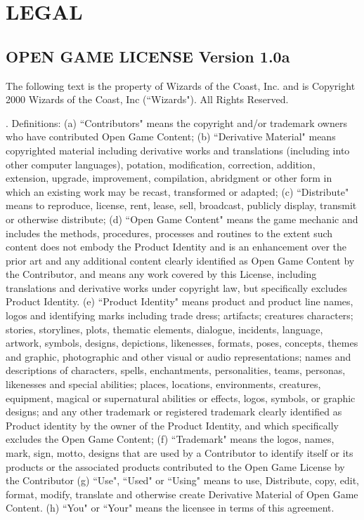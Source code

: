 \chapter{LEGAL}

\begin{multicols}{2}

\section{OPEN GAME LICENSE Version 1.0a} 

\noindent The following text is the property of Wizards of the Coast, Inc. and is Copyright 2000 Wizards of the Coast, Inc (``Wizards"). All Rights Reserved. 

\vspace{1em} . Definitions: (a) ``Contributors" means the copyright and/or trademark owners who have contributed Open Game Content; (b) ``Derivative Material" means copyrighted material including derivative works and translations (including into other computer languages), potation, modification, correction, addition, extension, upgrade, improvement, compilation, abridgment or other form in which an existing work may be recast, transformed or adapted; (c) ``Distribute" means to reproduce, license, rent, lease, sell, broadcast, publicly display, transmit or otherwise distribute; (d) ``Open Game Content" means the game mechanic and includes the methods, procedures, processes and routines to the extent such content does not embody the Product Identity and is an enhancement over the prior art and any additional content clearly identified as Open Game Content by the Contributor, and means any work covered by this License, including translations and derivative works under copyright law, but specifically excludes Product Identity. (e) ``Product Identity" means product and product line names, logos and identifying marks including trade dress; artifacts; creatures characters; stories, storylines, plots, thematic elements, dialogue, incidents, language, artwork, symbols, designs, depictions, likenesses, formats, poses, concepts, themes and graphic, photographic and other visual or audio representations; names and descriptions of characters, spells, enchantments, personalities, teams, personas, likenesses and special abilities; places, locations, environments, creatures, equipment, magical or supernatural abilities or effects, logos, symbols, or graphic designs; and any other trademark or registered trademark clearly identified as Product identity by the owner of the Product Identity, and which specifically excludes the Open Game Content; (f) ``Trademark" means the logos, names, mark, sign, motto, designs that are used by a Contributor to identify itself or its products or the associated products contributed to the Open Game License by the Contributor (g) ``Use", ``Used" or ``Using" means to use, Distribute, copy, edit, format, modify, translate and otherwise create Derivative Material of Open Game Content. (h) ``You" or ``Your" means the licensee in terms of this agreement. 


\end{multicols}
